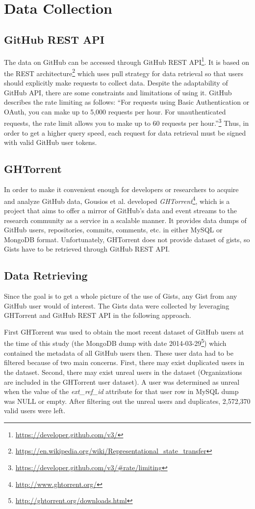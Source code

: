 \section{Data Collection}

\subsection{GitHub REST API}
The data on GitHub can be accessed through GitHub REST API\footnote{\url{https://developer.github.com/v3/}}. It is based on the REST architecture\footnote{\url{https://en.wikipedia.org/wiki/Representational_state_transfer}} which uses pull strategy for data retrieval so that users should explicitly make requests to collect data. Despite the adaptability of GitHub API, there are some constraints and limitations of using it. GitHub describes the rate limiting as follows: ``For requests using Basic Authentication or OAuth, you can make up to 5,000 requests per hour. For unauthenticated requests, the rate limit allows you to make up to 60 requests per hour.''\footnote{\url{https://developer.github.com/v3/\#rate/limiting}} Thus, in order to get a higher query speed, each request for data retrieval must be signed with valid GitHub user tokens.

\subsection{GHTorrent}
In order to make it convenient enough for developers or researchers to acquire and analyze GitHub data, Gousios et al. developed \textit{GHTorrent}\footnote{\url{http://www.ghtorrent.org/}}, which is a project that aims to offer a mirror of GitHub's data and event streams to the research community as a service in a scalable manner.\cite{6224294} It provides data dumps of GitHub users, repositories, commits, comments, etc. in either MySQL or MongoDB format. Unfortunately, GHTorrent does not provide dataset of gists, so Gists have to be retrieved through GitHub REST API. 

\subsection{Data Retrieving}
Since the goal is to get a whole picture of the use of Gists, any Gist from any GitHub user would of interest. The Gists data were collected by leveraging GHTorrent and GitHub REST API in the following approach. 

First GHTorrent was used to obtain the most recent dataset of GitHub users at the time of this study (the MongoDB dump with date 2014-03-29\footnote{\url{http://ghtorrent.org/downloads.html}}) which contained the metadata of all GitHub users then. These user data had to be filtered because of two main concerns. First, there may exist duplicated users in the dataset. Second, there may exist unreal users in the dataset (Organizations are included in the GHTorrent user dataset\cite{Kalliamvakou:2014:PPM:2597073.2597074}). A user was determined as unreal when the value of the \textit{ext\_ref\_id} attribute for that user row in MySQL dump was NULL or empty. After filtering out the unreal users and duplicates, 2,572,370 valid users were left. 

